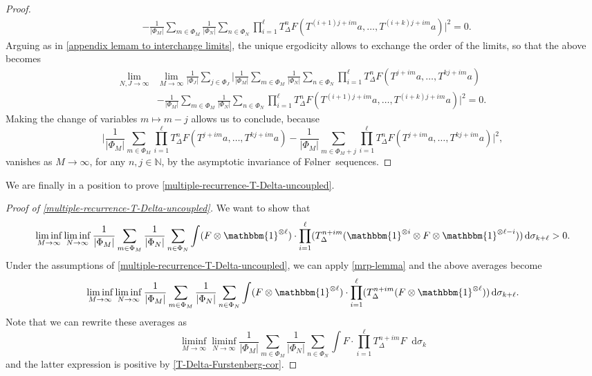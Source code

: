 \documentclass[letter, 11pt]{article}
\newcommand{\Folner}{F\o{}lner}
\theoremstyle{definition}
\theoremstyle{plain}
\newcommand{\N}{\mathbb{N}}
\newcommand*\diff{\mathop{}\!\mathrm{d}}
\newcommand{\edit}[3]{\color{#1}{#3}\color{black}\marginpar{\textcolor{#1}{[[#2]]}}}
\newcommand{\ioannis}[1]{\edit{red!60}{IK}{#1}}
\newcommand{\1}{\mathbbm{1}}
\begin{document}
\begin{proof}
\begin{align*}
      &- \frac{1}{|\Phi_M|}\sum_{m\in \Phi_M} \frac{1}{|\Phi_N|} \sum_{n\in \Phi_N}\prod_{i=1}^{\ell} T_\Delta^{n}  F (T^{(i+1)j+im}a,\ldots, T^{(i+k)j+im}a)\Bigg|^2=0.  
\end{align*}
Arguing as in \cref{appendix lemam to interchange limits}, the unique ergodicity allows to exchange the order of the limits, so that the above becomes
\begin{align*}
\lim_{N,J\to \infty}&\lim_{M\to \infty}\frac{1}{|\Phi_J|}\sum_{j\in \Phi_J} \Bigg| \frac{1}{|\Phi_M|}\sum_{m\in \Phi_M} \frac{1}{|\Phi_N|} \sum_{n\in \Phi_N}  \prod_{i=1}^{\ell} T_\Delta^{n}  F(T^{j+im}a,\ldots,T^{kj+im}a) \\
      &- \frac{1}{|\Phi_M|}\sum_{m\in \Phi_M} \frac{1}{|\Phi_N|} \sum_{n\in \Phi_N}\prod_{i=1}^{\ell} T_\Delta^{n}  F (T^{(i+1)j+im}a,\ldots, T^{(i+k)j+im}a)\Bigg|^2=0.  
\end{align*}
Making the change of variables $m\mapsto m-j$ allows us to conclude, because 
$$ \Bigg| \frac{1}{|\Phi_M|} \sum_{m\in \Phi_M}  \prod_{i=1}^{\ell} T_\Delta^{n}  F(T^{j+im}a,\ldots,T^{kj+im}a) - \frac{1}{|\Phi_M|} \sum_{m\in \Phi_M+j}\prod_{i=1}^{\ell} T_\Delta^{n}  F (T^{j+im}a,\ldots, T^{kj+im}a)\Bigg|^2,$$
vanishes as $M\to \infty$, for any $n,j\in \N$, by the asymptotic invariance of \Folner\ sequences.
\end{proof}

We are finally in a position to prove \cref{multiple-recurrence-T-Delta-uncoupled}.
\begin{proof}[Proof of \cref{multiple-recurrence-T-Delta-uncoupled}]
We want to show that 
$$ \liminf_{M\to\infty}\liminf_{N\to\infty}\frac{1}{|\Phi_M|} \sum_{m\in \Phi_M}  \frac{1}{|\Phi_N|} \sum_{n\in \Phi_N} \int (F\otimes \1^{\otimes \ell}) \cdot \prod_{i=1}^{\ell}  (T_{\Delta}^{n+im} (\1^{\otimes i} \otimes F\otimes \1^{\otimes \ell -i})) \diff\sigma_{k+\ell}>0.$$ 
Under the assumptions of \cref{multiple-recurrence-T-Delta-uncoupled}, 
we can apply \cref{mrp-lemma} and the above averages become
$$ \liminf_{M\to\infty}\liminf_{N\to\infty}\frac{1}{|\Phi_M|} \sum_{m\in \Phi_M}  \frac{1}{|\Phi_N|} \sum_{n\in \Phi_N} \int (F\otimes \1^{\otimes \ell}) \cdot \prod_{i=1}^{\ell}  (T_{\Delta}^{n+im} (F\otimes \1^{\otimes \ell})) \diff\sigma_{k+\ell}.$$
Note that we can rewrite these averages as 
$$ \liminf_{M\to\infty}\liminf_{N\to\infty}\frac{1}{|\Phi_M|} \sum_{m\in \Phi_M}  \frac{1}{|\Phi_N|} \sum_{n\in \Phi_N} \int F \cdot \prod_{i=1}^{\ell}  T_{\Delta}^{n+im} F \diff \sigma_k$$
and the latter expression is positive by \cref{T-Delta-Furstenberg-cor}.
\end{proof}
\end{document}
